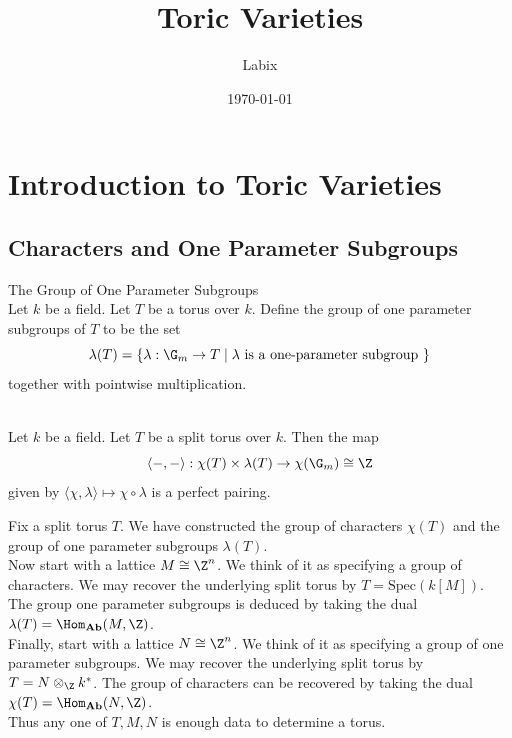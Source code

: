 \documentclass[a4paper]{article}
\title{Toric Varieties}
\author{Labix}
\date{\today}
\begin{document}
\maketitle
\begin{abstract}
\end{abstract}
\pagebreak
\tableofcontents
\pagebreak

\section{Introduction to Toric Varieties}
\subsection{Characters and One Parameter Subgroups}
\begin{defn}{The Group of One Parameter Subgroups}{}\\
Let $k$ be a field. Let $T$ be a torus over $k$. Define the group of one parameter subgroups of $T$ to be the set $$\lambda(T)=\{\lambda:\G_m\to T\;|\;\lambda\text{ is a one-parameter subgroup }\}$$ together with pointwise multiplication. 
\end{defn}

\begin{lmm}{}{}\\
Let $k$ be a field. Let $T$ be a split torus over $k$. Then the map $$\langle-,-\rangle:\chi(T)\times\lambda(T)\to\chi(\G_m)\cong\Z$$ given by $\langle\chi,\lambda\rangle\mapsto\chi\circ\lambda$ is a perfect pairing. 
\end{lmm}

Fix a split torus $T$. We have constructed the group of characters $\chi(T)$ and the group of one parameter subgroups $\lambda(T)$. \\

Now start with a lattice $M\cong\Z^n$. We think of it as specifying a group of characters. We may recover the underlying split torus by $T=\text{Spec}(k[M])$. The group one parameter subgroups is deduced by taking the dual $\lambda(T)=\Hom_\bold{Ab}(M,\Z)$. \\

Finally, start with a lattice $N\cong\Z^n$. We think of it as specifying a group of one parameter subgroups. We may recover the underlying split torus by $T=N\otimes_\Z k^\ast$. The group of characters can be recovered by taking the dual $\chi(T)=\Hom_\bold{Ab}(N,\Z)$. \\

Thus any one of $T,M,N$ is enough data to determine a torus. 
\end{document}
